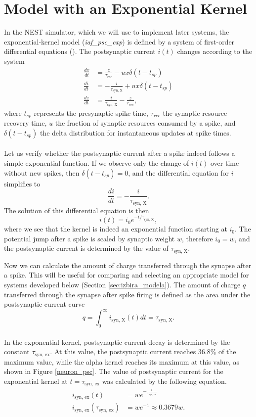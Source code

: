 \documentclass[a4paper,12pt,openright]{book}
\begin{document}
\section{Model with an Exponential Kernel}
\label{eksponentno_jedro}
In the NEST simulator, which we will use to implement later systems, the exponential-kernel model (\textit{iaf\_psc\_exp}) is defined by a system of first-order differential equations (\citet{expModel}). The postsynaptic current $i(t)$ changes according to the system
\begin{align*}
    \frac{dx}{dt}&=\frac{z}{\tau_{rec}}-ux\delta({t-t_{sp}}) \\
    \frac{di}{dt}&=-\frac{i}{\tau_{\text{syn, X}}}+ux\delta({t-t_{sp}}) \\
    \frac{dz}{dt}&=\frac{i}{\tau_{\text{syn, X}}}-\frac{z}{\tau_{rec}} ,
\end{align*}
where $t_{sp}$ represents the presynaptic spike time, 
$\tau_{rec}$ the synaptic resource recovery time,
$u$ the fraction of synaptic resources consumed by a spike, and
$\delta(t-t_{sp})$ the delta distribution for instantaneous updates at spike times.
\\
\\
Let us verify whether the postsynaptic current after a spike indeed follows a simple exponential function. If we observe only the change of $i(t)$ over time without new spikes, then $\delta(t-t_{sp})=0$, and the differential equation for $i$ simplifies to
\begin{equation*}
    \frac{di}{dt}=-\frac{i}{\tau_{\text{syn, X}}} .
\end{equation*}
The solution of this differential equation is then
\begin{equation*}
    i(t)=i_0 e^{-t/\tau_{\text{syn, X}}} ,
\end{equation*}
where we see that the kernel is indeed an exponential function starting at $i_0$. The potential jump after a spike is scaled by synaptic weight $w$, therefore $i_0=w$, and the postsynaptic current is determined by the value of $\tau_{\text{syn, X}}$.

Now we can calculate the amount of charge transferred through the synapse after a spike. This will be useful for comparing and selecting an appropriate model for systems developed below (Section \ref{sec:izbira_modela}). The amount of charge $q$ transferred through the synapse after spike firing is defined
as the area under the postsynaptic current curve
\[
q = \int_0^{\infty} i_{\text{syn, X}}(t) dt = \tau_{\text{syn, X}} .
\]
\\
\noindent In the exponential kernel, postsynaptic current decay is determined by the constant $\tau_{\text{syn, ex}}$. At this value, the postsynaptic current reaches $36.8\%$ of the maximum value, while the alpha kernel reaches its maximum at this value, as shown in Figure \ref{neuron_psc}. The value of postsynaptic current for the exponential kernel at $t=\tau_{\text{syn, ex}}$ was calculated by the following equation.
\begin{align*}
    i_{\text{syn, ex}}(t) &= w e^{-\frac{t}{\tau_{\text{syn, ex}}}} \\
    i_{\text{syn, ex}}(\tau_{\text{syn, ex}}) &= w e^{-1} \approx 0.3679 w.
\end{align*}
\end{document}
